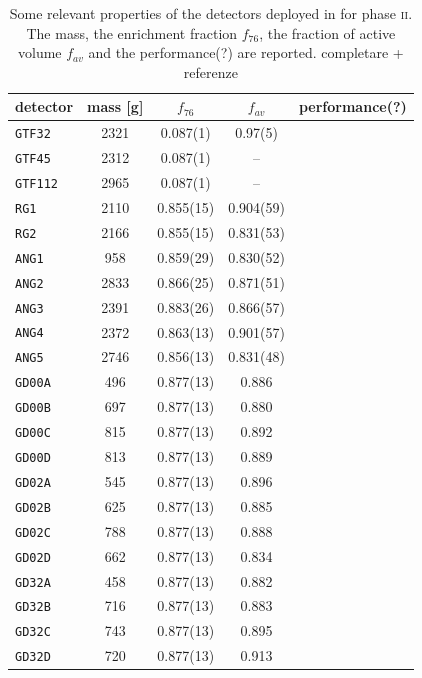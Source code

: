 \begin{table}
	\begin{center}
		\caption{Some relevant properties of the detectors deployed in {\gerda} for phase \textsc{ii}. The mass, the enrichment fraction $f_{76}$, the fraction of active volume $f_{av}$ and the performance(?) are reported. {\color{red}completare + referenze}}\label{tab:gedet}
	\begin{tabular}{lcccc}
		\toprule
		detector		&	mass [g]	&	$f_{76}$	&	$f_{av}$	&	performance(?) \\
		\midrule
		\texttt{GTF32}	&	2321	&	0.087(1)	&	0.97(5)		&		\\
		\texttt{GTF45}	&	2312	&	0.087(1)	&	--			&		\\
		\texttt{GTF112}	&	2965	&	0.087(1)	&	--			&		\\
		\texttt{RG1}	&	2110	&	0.855(15)	&	0.904(59)	&		\\
		\texttt{RG2}	&	2166	&	0.855(15)	&	0.831(53)	&		\\
		\texttt{ANG1}	&	958 	&	0.859(29)	&	0.830(52)	&		\\
		\texttt{ANG2}	&	2833	&	0.866(25)	&	0.871(51)	&		\\
		\texttt{ANG3}	&	2391	&	0.883(26)	&	0.866(57)	&		\\
		\texttt{ANG4}	&	2372	&	0.863(13)	&	0.901(57)	&		\\
		\texttt{ANG5}	&	2746	&	0.856(13)	&	0.831(48)	&		\\
		\texttt{GD00A}	&	496 	&	0.877(13)	&	0.886   	&		\\
		\texttt{GD00B}	&	697 	&	0.877(13)	&	0.880   	&		\\
		\texttt{GD00C}	&	815 	&	0.877(13)	&	0.892   	&		\\
		\texttt{GD00D}	&	813 	&	0.877(13)	&	0.889   	&		\\
		\texttt{GD02A}	&	545 	&	0.877(13)	&	0.896   	&		\\
		\texttt{GD02B}	&	625 	&	0.877(13)	&	0.885   	&		\\
		\texttt{GD02C}	&	788 	&	0.877(13)	&	0.888   	&		\\
		\texttt{GD02D}	&	662 	&	0.877(13)	&	0.834   	&		\\
		\texttt{GD32A}	&	458 	&	0.877(13)	&	0.882   	&		\\
		\texttt{GD32B}	&	716 	&	0.877(13)	&	0.883   	&		\\
		\texttt{GD32C}	&	743 	&	0.877(13)	&	0.895   	&		\\
		\texttt{GD32D}	&	720 	&	0.877(13)	&	0.913   	&		\\

\end{tabular}
\end{center}
\end{table}

